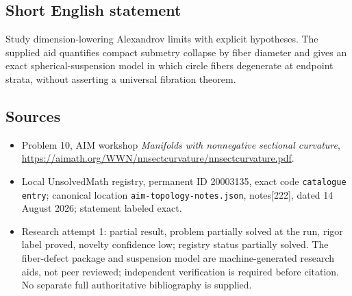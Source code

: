 \documentclass[11pt]{article}
\begin{document}
\subsection{Short English statement}
Study dimension-lowering Alexandrov limits with explicit hypotheses. The supplied aid quantifies compact submetry collapse by fiber diameter and gives an exact spherical-suspension model in which circle fibers degenerate at endpoint strata, without asserting a universal fibration theorem.
\subsection{Sources}
\begin{itemize}
\item Problem 10, AIM workshop \emph{Manifolds with nonnegative sectional curvature}, \url{https://aimath.org/WWN/nnsectcurvature/nnsectcurvature.pdf}.
\item Local UnsolvedMath registry, permanent ID 20003135, exact code \texttt{catalogue entry}; canonical location \texttt{aim-topology-notes.json}, notes[222], dated 14 August 2026; statement labeled exact.
\item Research attempt 1: partial result, problem partially solved at the run, rigor label proved, novelty confidence low; registry status partially solved. The fiber-defect package and suspension model are machine-generated research aids, not peer reviewed; independent verification is required before citation. No separate full authoritative bibliography is supplied.
\end{itemize}
\end{document}
